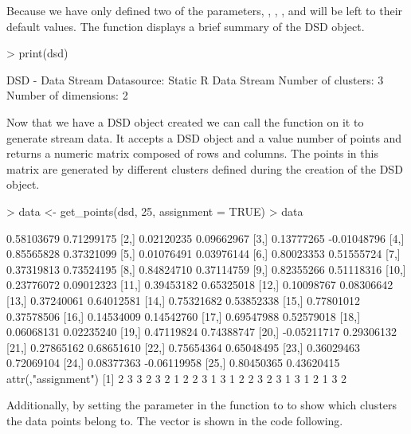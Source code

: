 \documentclass[nojss]{jss}
\begin{document}
Because we have only defined two of the parameters, , , , and  will be left to their default values. The  function displays a brief summary of the DSD object.

\begin{Schunk}
\begin{Sinput}
> print(dsd)
\end{Sinput}
\begin{Soutput}
DSD - Data Stream Datasource: Static R Data Stream 
Number of clusters: 3 
Number of dimensions: 2 
\end{Soutput}
\end{Schunk}

Now that we have a DSD object created we can call the  function on it to generate stream data. It accepts a DSD object and a value  number of points and returns a numeric matrix composed of  rows and  columns. The points in this matrix are generated by different clusters defined during the creation of the DSD object. 

\begin{Schunk}
\begin{Sinput}
> data <- get_points(dsd, 25, assignment = TRUE)
> data
\end{Sinput}
\begin{Soutput}
             [,1]        [,2]
 [1,]  0.58103679  0.71299175
 [2,]  0.02120235  0.09662967
 [3,]  0.13777265 -0.01048796
 [4,]  0.85565828  0.37321099
 [5,]  0.01076491  0.03976144
 [6,]  0.80023353  0.51555724
 [7,]  0.37319813  0.73524195
 [8,]  0.84824710  0.37114759
 [9,]  0.82355266  0.51118316
[10,]  0.23776072  0.09012323
[11,]  0.39453182  0.65325018
[12,]  0.10098767  0.08306642
[13,]  0.37240061  0.64012581
[14,]  0.75321682  0.53852338
[15,]  0.77801012  0.37578506
[16,]  0.14534009  0.14542760
[17,]  0.69547988  0.52579018
[18,]  0.06068131  0.02235240
[19,]  0.47119824  0.74388747
[20,] -0.05211717  0.29306132
[21,]  0.27865162  0.68651610
[22,]  0.75654364  0.65048495
[23,]  0.36029463  0.72069104
[24,]  0.08377363 -0.06119958
[25,]  0.80450365  0.43620415
attr(,"assignment")
 [1] 2 3 3 2 3 2 1 2 2 3 1 3 1 2 2 3 2 3 1 3 1 2 1 3 2
\end{Soutput}
\end{Schunk}

Additionally, by setting the parameter  in the  function to  to show which clusters the data points belong to. The  vector is shown in the code following.
\end{document}
